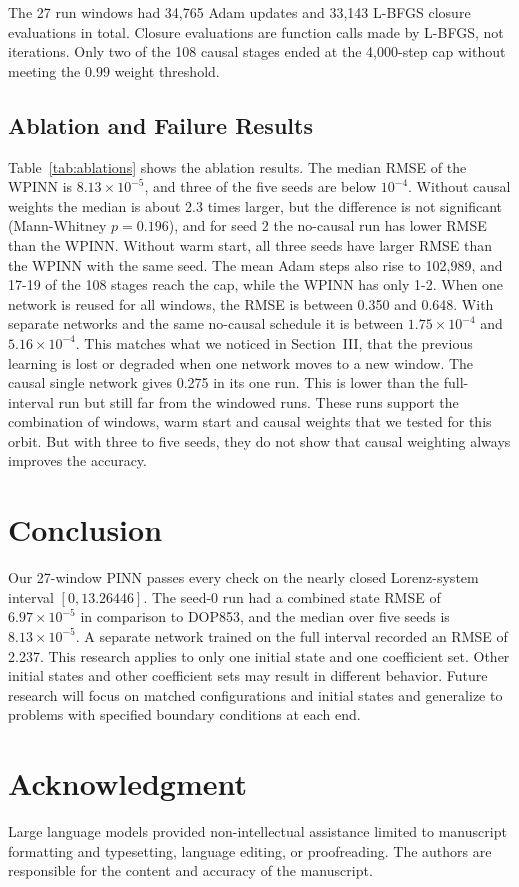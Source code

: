 \documentclass[conference,a4paper]{IEEEtran}
\begin{document}
The 27 run windows had 34,765 Adam updates and 33,143 L-BFGS closure evaluations in total. Closure evaluations are function calls made by L-BFGS, not iterations. Only two of the 108 causal stages ended at the 4,000-step cap without meeting the $0.99$ weight threshold.

\subsection{Ablation and Failure Results}
\label{subsec:ablation-results}
Table~\ref{tab:ablations} shows the ablation results. The median RMSE of the WPINN is $8.13\times10^{-5}$, and three of the five seeds are below $10^{-4}$. Without causal weights the median is about 2.3 times larger, but the difference is not significant (Mann-Whitney $p=0.196$), and for seed 2 the no-causal run has lower RMSE than the WPINN. Without warm start, all three seeds have larger RMSE than the WPINN with the same seed. The mean Adam steps also rise to 102,989, and 17-19 of the 108 stages reach the cap, while the WPINN has only 1-2. When one network is reused for all windows, the RMSE is between 0.350 and 0.648. With separate networks and the same no-causal schedule it is between $1.75\times10^{-4}$ and $5.16\times10^{-4}$. This matches what we noticed in Section~III, that the previous learning is lost or degraded when one network moves to a new window. The causal single network gives 0.275 in its one run. This is lower than the full-interval run but still far from the windowed runs. These runs support the combination of windows, warm start and causal weights that we tested for this orbit. But with three to five seeds, they do not show that causal weighting always improves the accuracy.

\section{Conclusion}

Our 27-window PINN passes every check on the nearly closed Lorenz-system interval $[0,13.26446]$. The seed-0 run had a combined state RMSE of $6.97\times10^{-5}$ in comparison to DOP853, and the median over five seeds is $8.13\times10^{-5}$. A separate network trained on the full interval recorded an RMSE of 2.237. This research applies to only one initial state and one coefficient set. Other initial states and other coefficient sets may result in different behavior. Future research will focus on matched configurations and initial states and generalize to problems with specified boundary conditions at each end.








\section*{Acknowledgment}
Large language models provided non-intellectual assistance limited to manuscript formatting and typesetting, language editing, or proofreading. The authors are responsible for the content and accuracy of the manuscript.



\end{document}
